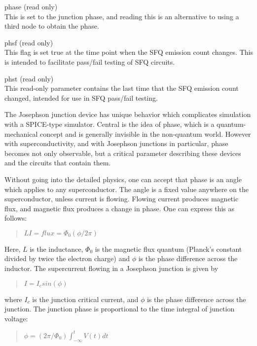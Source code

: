 \begin{description}
\item{\vt phase} (read only)\\
This is set to the junction phase, and reading this is an alternative
to using a third node to obtain the phase.
 
\item{\vt phsf} (read only)\\
This flag is set true at the time point when the SFQ emission count
changes.  This is intended to facilitate pass/fail testing of SFQ
circuits.

\item{\vt phst} (read only)\\
This read-only parameter contains the last time that the SFQ emission
count changed, intended for use in SFQ pass/fail testing.
\end{description}

The Josephson junction device has unique behavior which complicates
simulation with a SPICE-type simulator.  Central is the idea of phase,
which is a quantum-mechanical concept and is generally invisible in
the non-quantum world.  However with superconductivity, and with
Josephson junctions in particular, phase becomes not only observable,
but a critical parameter describing these devices and the circuits
that contain them.

Without going into the detailed physics, one can accept that phase is
an angle which applies to any superconductor.  The angle is a fixed
value anywhere on the superconductor, unless current is flowing. 
Flowing current produces magnetic flux, and magnetic flux produces a
change in phase.  One can express this as follows:

\begin{quote}
$LI = flux = \Phi_0(\phi/2\pi)$
\end{quote}

Here, $L$ is the inductance, $\Phi_0$ is the magnetic flux quantum
(Planck's constant divided by twice the electron charge) and $\phi$ is
the phase difference across the inductor.  The supercurrent flowing in
a Josephson junction is given by

\begin{quote}
$I = I_c sin(\phi)$
\end{quote}

where $I_c$ is the junction critical current, and $\phi$ is the phase
difference across the junction.  The junction phase is proportional to
the time integral of junction voltage:

\begin{quote}
$\phi = (2\pi/\Phi_0)\int^t_{-\infty} V(t)dt$
\end{quote}

